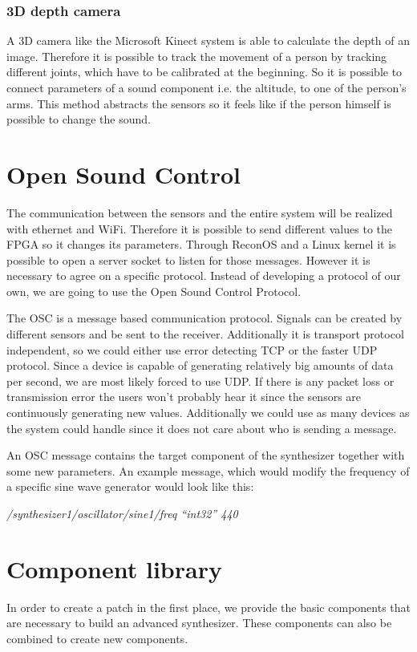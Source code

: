 \subsubsection{3D depth camera}
A 3D camera like the Microsoft Kinect system is able to calculate the depth of an image. 
Therefore it is possible to track the movement of a person by tracking different joints, which have to be calibrated at the beginning. 
So it is possible to connect parameters of a sound component i.e. the altitude, to one of the person's arms. 
This method abstracts the sensors so it feels like if the person himself is possible to change the sound.

\section{Open Sound Control}
The communication between the sensors and the entire system will be realized with ethernet and WiFi. 
Therefore it is possible to send different values to the \ac{FPGA} so it changes its parameters. 
Through ReconOS and a Linux kernel it is possible to open a server socket to listen for those messages. 
However it is necessary to agree on a specific protocol. Instead of developing a protocol of our own, we are going to use the Open Sound Control Protocol.

The \ac{OSC} is a message based communication protocol. 
Signals can be created by different sensors and be sent to the receiver. 
Additionally it is transport protocol independent, so we could either use error detecting TCP or the faster UDP protocol. 
Since a device is capable of generating relatively big amounts of data per second, we are most likely forced to use UDP. 
If there is any packet loss or transmission error the users won't probably hear it since the sensors are continuously generating new values. 
Additionally we could use as many devices as the system could handle since it does not care about who is sending a message.

An \ac{OSC} message contains the target component of the synthesizer together with some new parameters. 
An example message, which would modify the frequency of a specific sine wave generator would look like this: 

\emph{/synthesizer1/oscillator/sine1/freq “int32” 440} \\


\section{Component library}
In order to create a patch in the first place, we provide the basic components that are necessary to build an advanced synthesizer. 
These components can also be combined to create new components.



